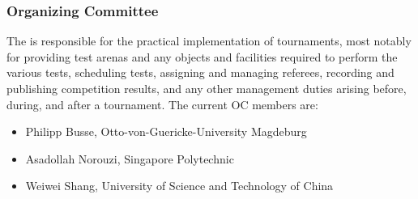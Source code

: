 \subsubsection{Organizing Committee}
The  is responsible for the practical implementation of tournaments, most notably for providing test arenas and any objects and facilities required to perform the various tests, scheduling tests, assigning and managing referees, recording and publishing competition results, and any other management duties arising before, during, and after a tournament. The current OC members are:

\begin{itemize}
	\item Philipp Busse, Otto-von-Guericke-University Magdeburg
	\item Asadollah Norouzi, Singapore Polytechnic
	\item Weiwei Shang, University of Science and Technology of China
\end{itemize}







